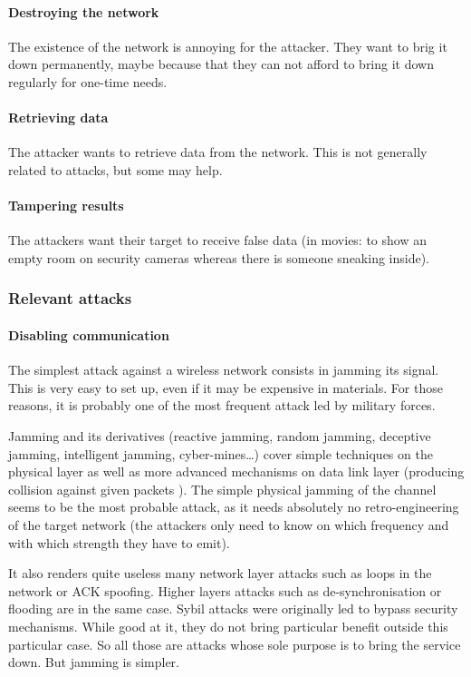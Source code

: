 \paragraph{Destroying the network}
The existence of the network is annoying for the attacker.
They want to brig it down permanently, maybe because that they can not afford to bring it down regularly for one-time needs.

\paragraph{Retrieving data}
The attacker wants to retrieve data from the network.
This is not generally related to \dos attacks, but some may help.

\paragraph{Tampering results}
The attackers want their target to receive false data (\eg in movies: to show an empty room on security cameras whereas there is someone sneaking inside).

\subsubsection{Relevant attacks}

\paragraph{Disabling communication}
The simplest \dos attack against a wireless network consists in jamming its signal.
This is very easy to set up, even if it may be expensive in materials.
For those reasons, it is probably one of the most frequent attack led by military forces.

Jamming and its derivatives (reactive jamming, random jamming, deceptive jamming, intelligent jamming, cyber-mines\dots) cover simple techniques on the physical layer as well as more advanced mechanisms on data link layer (producing collision against given packets \etc).
The simple physical jamming of the channel seems to be the most probable attack, as it needs absolutely no retro-engineering of the target network (the attackers only need to know on which frequency and with which strength they have to emit).

It also renders quite useless many network layer \dos attacks such as loops in the network or ACK spoofing.
Higher layers attacks such as de-synchronisation or flooding are in the same case.
Sybil attacks were originally led to bypass security mechanisms.
While good at it, they do not bring particular benefit outside this particular case.
So all those are attacks whose sole purpose is to bring the service down.
But jamming is simpler.

